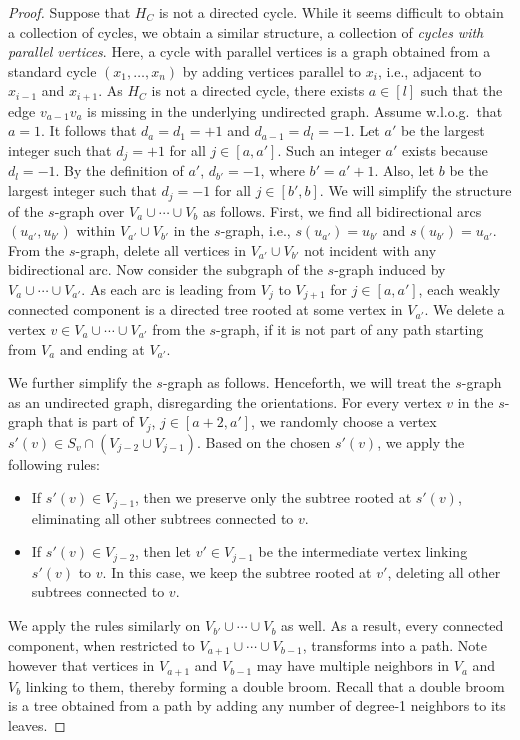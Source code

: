 \begin{proof}
  Suppose that $H_C$ is not a directed cycle.
  While it seems difficult to obtain a collection of cycles, we obtain a similar structure, a collection of \emph{cycles with parallel vertices}.
  Here, a cycle with parallel vertices is a graph obtained from a standard cycle $(x_1, \dots, x_n)$ by adding vertices parallel to $x_i$, i.e., adjacent to $x_{i-1}$ and $x_{i+1}$.
  As $H_C$ is not a directed cycle, there exists $a \in [l]$ such that the edge $v_{a-1} v_{a}$ is missing in the underlying undirected graph.
  Assume w.l.o.g.\ that $a = 1$.
  It follows that $d_a = d_1 = +1$ and $d_{a-1} = d_{l} = -1$.
  Let $a'$ be the largest integer such that $d_j = +1$ for all $j \in [a, a']$.
  Such an integer $a'$ exists because $d_l = -1$.
  By the definition of $a'$, $d_{b'} = -1$, where $b' = a' + 1$.
  Also, let $b$ be the largest integer such that $d_j = -1$ for all $j \in [b', b]$.
  We will simplify the structure of the $s$-graph over $V_a \cup \cdots \cup V_b$ as follows.
  First, we find all bidirectional arcs $(u_{a'}, u_{b'})$ within $V_{a'} \cup V_{b'}$ in the $s$-graph, i.e., $s(u_{a'})= u_{b'}$ and $s(u_{b'}) = u_{a'}$.
  From the $s$-graph, delete all vertices in $V_{a'} \cup V_{b'}$ not incident with any bidirectional arc.
  Now consider the subgraph of the $s$-graph induced by $V_a \cup \cdots \cup V_{a'}$.
  As each arc is leading from $V_j$ to $V_{j+1}$ for $j \in [a, a']$, each weakly connected component is a directed tree rooted at some vertex in $V_{a'}$.
  We delete a vertex $v \in V_{a} \cup \cdots \cup V_{a'}$ from the $s$-graph, if it is not part of any path starting from $V_{a}$ and ending at $V_{a'}$.
  
  We further simplify the $s$-graph as follows.
  Henceforth, we will treat the $s$-graph as an undirected graph, disregarding the orientations.
  For every vertex $v$ in the $s$-graph that is part of $V_j$, $j \in [a+2, a']$, we randomly choose a vertex $s'(v) \in S_v \cap (V_{j-2} \cup V_{j-1})$.
  Based on the chosen $s'(v)$, we apply the following rules:
  \begin{itemize}
    \item If $s'(v) \in V_{j-1}$, then we preserve only the subtree rooted at $s'(v)$, eliminating all other subtrees connected to $v$. \item If $s'(v) \in V_{j-2}$, then let $v'\in V_{j-1}$ be the intermediate vertex linking $s'(v)$ to $v$.
    In this case, we keep the subtree rooted at $v'$, deleting all other subtrees connected to $v$.
  \end{itemize}
  We apply the rules similarly on $V_{b'} \cup \cdots \cup V_{b}$ as well.
  As a result, every connected component, when restricted to $V_{a+1} \cup \cdots \cup V_{b-1}$, transforms into a path.
  Note however that vertices in $V_{a+1}$ and $V_{b-1}$ may have multiple neighbors in $V_a$ and $V_{b}$ linking to them, thereby forming a double broom.
  Recall that a double broom is a tree obtained from a path by adding any number of degree-1 neighbors to its leaves.


\end{proof}
